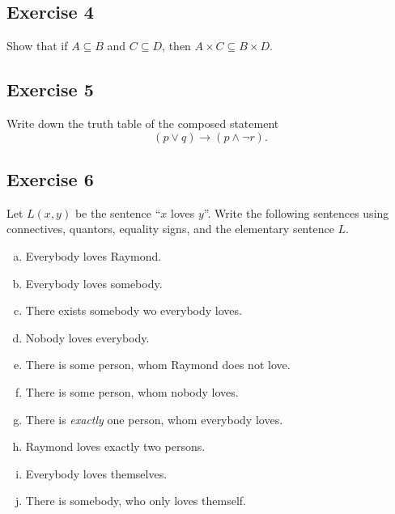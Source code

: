 \documentclass{amsart}
\theoremstyle{definition} \newtheorem*{definition}{Definition}
\theoremstyle{remark} \newtheorem*{ex}{Example}
\begin{document}
\subsection*{Exercise 4}
Show that if $A\subseteq B$ and $C\subseteq D$, then $A\times C\subseteq B\times D$.


\subsection*{Exercise 5}
Write down the truth table of the composed statement $$(p \vee
q) \to (p \wedge \neg r).$$

\subsection*{Exercise 6} 
Let $L(x, y)$ be the sentence ``$x$ loves $y$''. Write the following sentences using connectives, quantors, equality signs, and the elementary sentence $L$.
\begin{enumerate}[a)]
\item Everybody loves Raymond.
\item Everybody loves somebody.
\item There exists somebody wo everybody loves.
\item Nobody loves everybody.
\item There is some person, whom Raymond does not love.
\item There is some person, whom nobody loves.
\item There is {\em exactly} one person, whom everybody loves.
\item Raymond loves exactly two persons.
\item Everybody loves themselves.
\item There is somebody, who only loves themself.
\end{enumerate}
\end{document}
